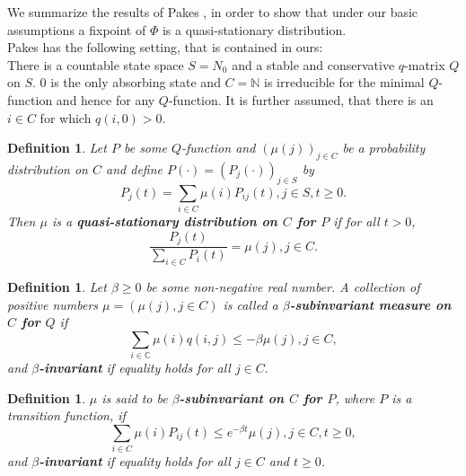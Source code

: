 \documentclass[12pt,a4paper]{scrartcl}
\newtheorem{definition}[theorem]{Definition}
\numberwithin{equation}{section}
\newcommand{\C}{\mathbb{C}} %
\newcommand{\N}{\mathbb{N}} %
\begin{document}
We summarize the results of Pakes \cite{pakes}, in order to show that under our basic assumptions a fixpoint of $\Phi$ is a quasi-stationary distribution.\\[2ex]

Pakes has the following setting, that is contained in ours:\\
There is a countable state space $S = N_0$ and a stable and conservative $q$-matrix $Q$ on $S$. $0$ is the only absorbing state and $C = \N$  is irreducible for the minimal $Q$-function and hence for any $Q$-function. It is further assumed, that there is an $i \in C$ for which $q\left(i,0\right) > 0.$

\begin{definition} \label{def:pakesquasistationary}
Let $P$ be some $Q$-function and $\left(\mu\left(j\right)\right)_{j \in C}$ be a probability distribution on $C$ and define $P\left(\cdot\right) = \left(P_j\left(\cdot\right)\right)_{j \in S}$ by
\begin{equation*}
P_j\left(t\right) = \sum_{i \in C} \mu\left(i\right) P_{ij}\left(t\right), j \in S, t \geq 0.
\end{equation*}
Then $\mu$ is a \textbf{quasi-stationary distribution on $C$ for $P$} if for all $t > 0$,
\begin{equation*}
\frac{P_j\left(t\right)}{\sum_{i \in C}P_i\left(t\right)} = \mu\left(j\right), j \in C.
\end{equation*}
\end{definition}

\begin{definition}
Let $\beta \geq 0$ be some non-negative real number. A collection of positive numbers $ \mu = \left(\mu\left(j\right), j \in C\right)$ is called a \textbf{$\beta$-subinvariant measure on $C$ for $Q$} if
\begin{equation}
\sum_{i \in \C} \mu\left(i\right) q\left(i,j\right) \leq -\beta \mu\left(j\right), j \in C,
\end{equation}
and \textbf{$\beta$-invariant} if equality holds for all $j \in C.$
\end{definition}

\begin{definition}
$\mu$ is said to be \textbf{$\beta$-subinvariant on $C$ for $P$}, where $P$ is a transition function, if
\begin{equation}
\sum_{i \in C} \mu\left(i\right) P_{ij}\left(t\right) \leq e^{-\beta t} \mu\left(j\right), j \in C, t\geq 0,
\end{equation}
and \textbf{$\beta$-invariant} if equality holds for all $j \in C$ and $t\geq 0$.
\end{definition}
\end{document}
